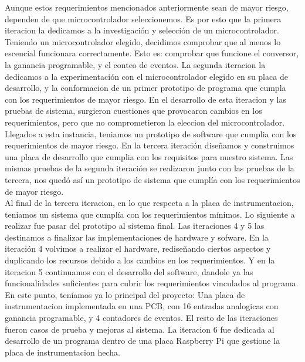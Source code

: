 Aunque estos requerimientos mencionados anteriormente sean de mayor riesgo, dependen de que microcontrolador seleccionemos. Es por esto que la primera iteracion la dedicamos a la investigación y selección de un microcontrolador. \\

Teniendo un microcontrolador elegido, decidimos comprobar que al menos lo escencial funcionara correctamente. Esto es: comprobar que funcione el conversor, la ganancia programable, y el conteo de eventos. La segunda iteracion la dedicamos a la experimentación con el microcontrolador elegido en su placa de desarrollo, y la conformacion de un primer prototipo de programa que cumpla con los requerimientos de mayor riesgo. En el desarrollo de esta iteracion y las pruebas de sistema, surgieron cuestiones que provocaron cambios en los requerimientos, pero que no comprometieron la eleccion del microcontrolador.  \\

Llegados a esta instancia, teniamos un prototipo de software que cumplia con los requerimientos de mayor riesgo. En la tercera iteración diseñamos y construimos una placa de desarrollo que cumplia con los requisitos para nuestro sistema. Las mismas pruebas de la segunda iteración se realizaron junto con las pruebas de la tercera, nos quedó así un prototipo de sistema que cumplía con los requerimientos de mayor riesgo. \\

Al final de la tercera iteracion, en lo que respecta a la placa de instrumentacion, teniamos un sistema que cumplía con los requerimientos mínimos. Lo siguiente a realizar fue pasar del prototipo al sistema final. Las iteraciones 4 y 5 las destinamos a finalizar las implementaciones de hardware y sofware. En la iteración 4 volvimos a realizar el hardware, rediseñando ciertos aspectos y duplicando los recursos debido a los cambios en los requerimientos. Y en la iteracion 5 continuamos con el desarrollo del software, dandole ya las funcionalidades suficientes para cubrir los requerimientos vinculados al programa. \\

En este punto, teníamos ya lo principal del proyecto: Una placa de instrumentacion implementada en una PCB, con 16 entradas analogicas con ganancia programable, y 4 contadores de eventos. El resto de las iteraciones fueron casos de prueba y mejoras al sistema. 
La iteracion 6 fue dedicada al desarrollo de un programa dentro de una placa Raspberry Pi que gestione la placa de instrumentacion hecha.  \\

